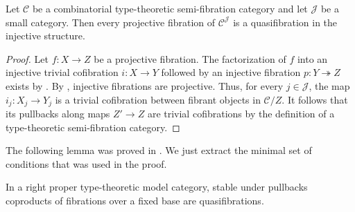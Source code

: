 \documentclass[reqno]{amsart}
\theoremstyle{definition}
\theoremstyle{remark}
\newcommand{\scat}[1]{\mathcal{#1}}
\numberwithin{figure}{section}
\begin{document}
\begin{lem}
Let $\scat{C}$ be a combinatorial type-theoretic semi-fibration category and let $\scat{J}$ be a small category.
Then every projective fibration of $\scat{C}^\scat{J}$ is a quasifibration in the injective structure.
\end{lem}
\begin{proof}
Let $f : X \to Z$ be a projective fibration.
The factorization of $f$ into an injective trivial cofibration $i : X \to Y$ followed by an injective fibration $p : Y \twoheadrightarrow Z$ exists by \cite[Lemma~A.2.8.3]{lurie-topos}.
By , injective fibrations are projective.
Thus, for every $j \in \scat{J}$, the map $i_j : X_j \to Y_j$ is a trivial cofibration between fibrant objects in $\scat{C}/Z$.
It follows that its pullbacks along maps $Z' \to Z$ are trivial cofibrations by the definition of a type-theoretic semi-fibration category.
\end{proof}

The following lemma was proved in \cite[Theorem~3.3]{lum-shul-hits}.
We just extract the minimal set of conditions that was used in the proof.

\begin{lem}[quasifib]
In a right proper type-theoretic model category, stable under pullbacks coproducts of fibrations over a fixed base are quasifibrations.
\end{lem}
\end{document}
